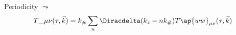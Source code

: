     Periodicity $\leadsto$
    \[ T\_{\mu\nu}(\tau, \vec{k}) = k_{\#}\sum_n \Diracdelta( k_z - n k_\# ) T\ap{ww}_{\mu\nu}(\tau, \vec{k}) \]






